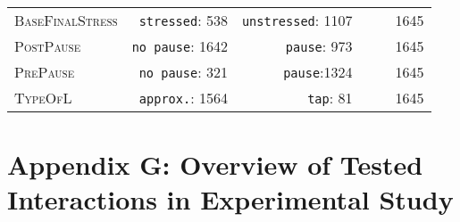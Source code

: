 \begin{table}[H]
\begin{center}
{\begin{tabular}{lrrrrr}
				\textsc{BaseFinalStress}       &\texttt{stressed}: 538& \texttt{unstressed}: 1107& & & 1645\\ 	
				\textsc{PostPause}       &\texttt{no pause}: 1642& \texttt{pause}: 973& && 1645 \\ 
				\textsc{PrePause}       &\texttt{no pause}: 321& \texttt{pause}:1324& & & 1645\\ 
				\textsc{TypeOfL}       &\texttt{approx.}: 1564 & \texttt{tap}: 81& & & 1645\\ 		
				
				\hline
			\end{tabular}
		}
	\end{center}

\end{table}



\section*{Appendix G: Overview of Tested Interactions in Experimental Study}\label{Appendix G Summaries of tested interactions in experimental study}

